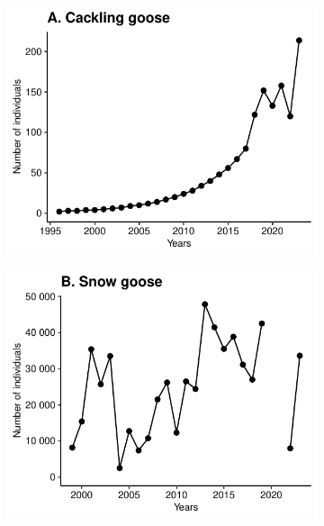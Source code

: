 \documentclass[a4paper,twoside,12pt]{article}
\begin{document}
\begin{landscape}

\end{landscape}
\restoregeometry
\newpage
\begin{figure}[h]
\caption{Time series of the estimated annual abundance of vertebrate species on the southern plain of Bylot Island (389 km\textsuperscript{2}). Estimated abundance represents adult individuals, with the exception of lemmings, for which juveniles were also included in the estimate. Time series shorter than 5 years are not presented.}
  \centering
  \begin{subfigure}{0.45\textwidth}
    \includegraphics[width=\linewidth]{figures/species_temporal_series/Cackling_goose.pdf}
  \end{subfigure}
  \begin{subfigure}{0.45\textwidth}
    \includegraphics[width=\linewidth]{figures/species_temporal_series/Snow_goose.pdf}

\end{subfigure}
\end{figure}
\end{document}
